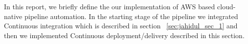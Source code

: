 In this report, we briefly define the our implementation of AWS based cloud-native
pipeline automation. In the starting stage of the pipeline we integrated Continuous integration which is described in section ~\ref{sec:jahidul_sec_1} and then we implemented Continuous deployment/delivery described in this section.  


